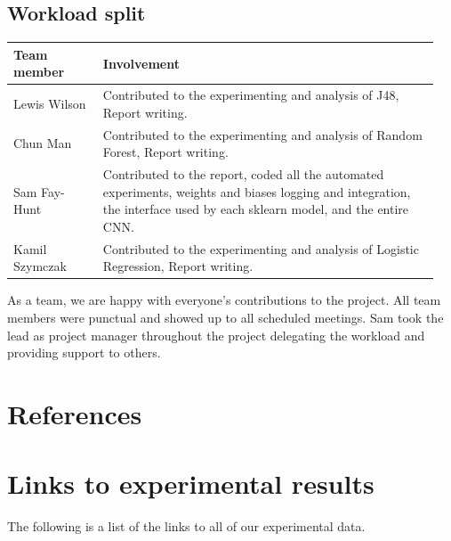 \documentclass[11pt]{article}
\begin{document}

\subsection{Workload split}
  
  \begin{table}[ht]
    \centering
    \begin{tabular}{|p{0.2\linewidth} | p{0.75\linewidth}|} 
      \hline
      \textbf{Team member}  & \textbf{Involvement} \\ \hline
      Lewis Wilson & Contributed to the experimenting and analysis of J48, Report writing. \\ \hline
      Chun Man & Contributed to the experimenting and analysis of Random Forest, Report writing. \\ \hline
      Sam Fay-Hunt & Contributed to the report, coded all the automated experiments, weights and biases logging and integration, the interface used by each sklearn model, and the entire CNN. \\ \hline
      Kamil Szymczak & Contributed to the experimenting and analysis of Logistic Regression, Report writing. \\ \hline
    \end{tabular}
  \end{table}\label{ContributionTab}

As a team, we are happy with everyone's contributions to the project. All team members were punctual and showed up to all scheduled meetings. Sam took the lead as project manager throughout the project delegating the workload and providing support to others.

\newpage
\section{References}
\printbibliography

\newpage
\section{Links to experimental results}
The following is a list of the links to all of our experimental data.
\end{document}
